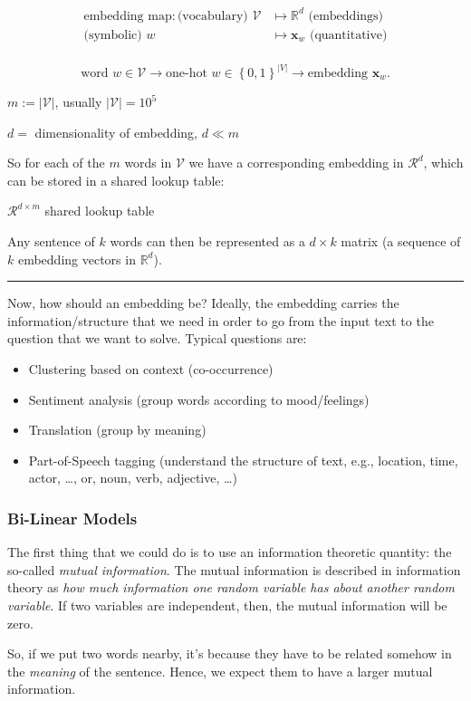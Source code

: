 \documentclass[a2paper,8pt]{extarticle}
\newcommand{\R}{\mathbb{R}}
\newcommand{\cR}{\mathcal{R}}
\newcommand{\cV}{\mathcal{V}}
\newcommand{\set}[1]{\left\{ #1 \right\}}
\newcommand{\card}[1]{\left\lvert #1 \right\rvert}
\renewcommand{\vec}[1]{\mathbf{#1}}
\newcommand{\vx}{\vec{x}}
\newcommand{\sep}{\vspace{0pt}\noindent\hrule\vspace{0pt}}
\newcommand{\sep}{\vspace{5pt}\noindent\hrule\vspace{5pt}}
\begin{document}
\begin{landscape}
\begin{multicols*}{7}
\begin{align*}
\text{embedding map}\colon
\text{(vocabulary) }\cV&\mapsto\R^d\text{ (embeddings)}\\
\text{(symbolic) }w&\mapsto \vx_{w}\text{ (quantitative)}\\
\end{align*}

\[
\text{word }w\in\cV
\to
\text{one-hot }w\in\set{0,1}^{\card{V}}
\to
\text{embedding } \vx_{w}.
\]

$m:=\card{\cV}$, usually $\card{\cV}=10^5$

$d=$ dimensionality of embedding, $d\ll m$ 

So for each of the $m$ words in $\cV$ we have a corresponding embedding in
$\cR^d$, which can be stored in a shared lookup table:

$\cR^{d\times m}$ shared lookup table

Any sentence of $k$ words can then be represented as a $d\times k$ matrix (a
sequence of $k$ embedding vectors in $\R^d$).

\sep

Now, how should an embedding be? Ideally, the embedding carries the
information/structure that we need in order to go from the input text to the
question that we want to solve. Typical questions are:
\begin{itemize}
  \item Clustering based on context (co-occurrence)
  \item Sentiment analysis (group words according to mood/feelings)
  \item Translation (group by meaning)
  \item Part-of-Speech tagging (understand the structure of text, e.g.,
  location, time, actor, \ldots, or, noun, verb, adjective, \ldots) 
\end{itemize}

\subsubsection{Bi-Linear Models}

The first thing that we could do is to use an information theoretic quantity:
the so-called \emph{mutual information}. The mutual information is described in
information theory as \emph{how much information one random variable has about
another random variable}. If two variables are independent, then, the mutual
information will be zero. 

So, if we put two words nearby, it's because they have to be related somehow in
the \emph{meaning} of the sentence. Hence, we expect them to have a larger
mutual information.


\end{multicols*}
\end{landscape}
\end{document}
